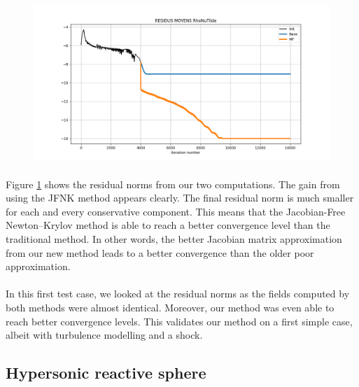         \begin{figure}
          \centering
          \includegraphics[width=\textwidth]{figures/rae_residuals.png}
          \caption{}
          \label{fig:rae_residuals}
        \end{figure}

        \paragraph{}
        Figure \ref{fig:rae_residuals} shows the residual norms from our two computations.
        The gain from using the JFNK method appears clearly.
        The final residual norm is much smaller for each and every conservative component.
        This means that the Jacobian-Free Newton--Krylov method is able to reach a better convergence level than the traditional method.
        In other words, the better Jacobian matrix approximation from our new method leads to a better convergence than the older poor approximation.

        \paragraph{}
        In this first test case, we looked at the residual norms as the fields computed by both methods were almost identical.
        Moreover, our method was even able to reach better convergence levels.
        This validates our method on a first simple case, albeit with turbulence modelling and a shock.


    \subsection{Hypersonic reactive sphere}

